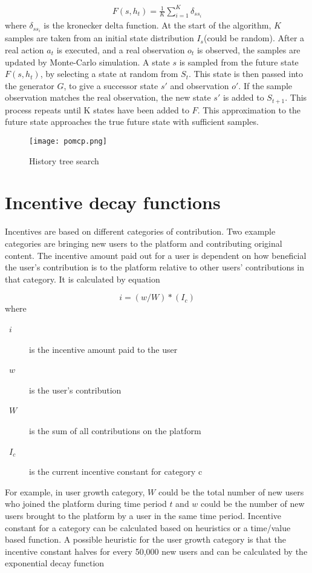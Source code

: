 \documentclass[a4paper]{article}
\begin{document}
\begin{gather*}
F(s, h_t) = \frac{1}{K} \sum_{i=1}^{K} \delta_{ss_i} 
\end{gather*}
where $\delta_{ss_i}$ is the kronecker delta function. At the start of the algorithm, $K$ samples are taken from an initial state distribution $I_s$(could be random). After a real action $a_t$ is executed, and a real observation $o_t$ is observed, the samples are updated by Monte-Carlo simulation. A state $s$ is sampled from the future state $F(s, h_t)$, by selecting a state at random from $S_t$. This state is then passed into the generator $G$, to give a successor state $s'$ and observation $o'$. If the sample observation matches the real observation, the new state $s'$ is added to $S_{t+1}$. This process repeats until K states have been added to $F$. This approximation to the future state approaches the true future state with sufficient samples.
\begin{figure}[h!] \centering
	\texttt{[image: pomcp.png]}
	\caption{History tree search} \label{fig:pomcp}
\end{figure}
\section{Incentive decay functions}
Incentives are based on different categories of contribution. Two example categories are bringing new users to the platform and contributing original content. The incentive amount paid out for a user is dependent on how beneficial the user’s contribution is to the platform relative to other users’ contributions in that category. It is calculated by equation 

\begin{equation}
i=(w/W)*(I_c)\label{eq:weighted_incentive}
\end{equation}
where
\begin{description}
	\item[~$i$] is the incentive amount paid to the user
	\item[~$w$] is the user's contribution
	\item[~$W$] is the sum of all contributions on the platform
	\item[~$I_c$] is the current incentive constant for category c
\end{description}
For example, in user growth category, $W$ could be the total number of new users who joined the platform during time period $t$ and $w$ could be the number of new users brought to the platform by a user in the same time period. Incentive constant for a category can be calculated based on heuristics or a time/value based function. A possible heuristic for the user growth category is that the incentive constant halves for every 50,000 new users and can be calculated by the exponential decay function 
\end{document}
